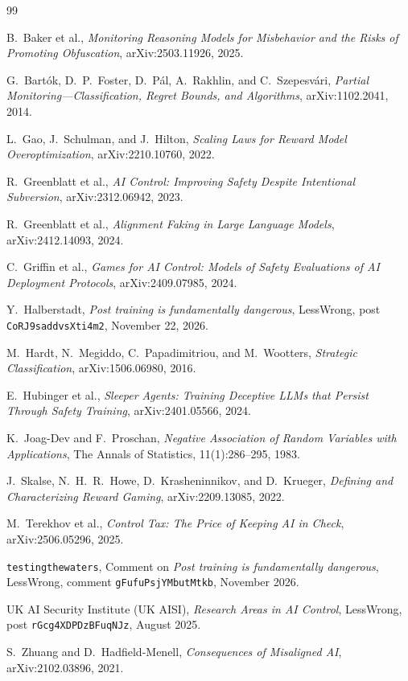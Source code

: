 \documentclass[11pt,a4paper]{article}
\begin{document}
\begin{thebibliography}{99}

B.~Baker et al.,
\emph{Monitoring Reasoning Models for Misbehavior and the Risks of Promoting Obfuscation},
arXiv:2503.11926, 2025.

G.~Bart\'ok, D.~P.~Foster, D.~P\'al, A.~Rakhlin, and C.~Szepesv\'ari,
\emph{Partial Monitoring---Classification, Regret Bounds, and Algorithms},
arXiv:1102.2041, 2014.

L.~Gao, J.~Schulman, and J.~Hilton,
\emph{Scaling Laws for Reward Model Overoptimization},
arXiv:2210.10760, 2022.

R.~Greenblatt et al.,
\emph{AI Control: Improving Safety Despite Intentional Subversion},
arXiv:2312.06942, 2023.

R.~Greenblatt et al.,
\emph{Alignment Faking in Large Language Models},
arXiv:2412.14093, 2024.

C.~Griffin et al.,
\emph{Games for AI Control: Models of Safety Evaluations of AI Deployment Protocols},
arXiv:2409.07985, 2024.

Y.~Halberstadt,
\emph{Post training is fundamentally dangerous},
LessWrong, post \texttt{CoRJ9saddvsXti4m2}, November 22, 2026.

M.~Hardt, N.~Megiddo, C.~Papadimitriou, and M.~Wootters,
\emph{Strategic Classification},
arXiv:1506.06980, 2016.

E.~Hubinger et al.,
\emph{Sleeper Agents: Training Deceptive LLMs that Persist Through Safety Training},
arXiv:2401.05566, 2024.

K.~Joag-Dev and F.~Proschan,
\emph{Negative Association of Random Variables with Applications},
The Annals of Statistics, 11(1):286--295, 1983.

J.~Skalse, N.~H.~R.~Howe, D.~Krasheninnikov, and D.~Krueger,
\emph{Defining and Characterizing Reward Gaming},
arXiv:2209.13085, 2022.

M.~Terekhov et al.,
\emph{Control Tax: The Price of Keeping AI in Check},
arXiv:2506.05296, 2025.

\texttt{testingthewaters},
Comment on \emph{Post training is fundamentally dangerous},
LessWrong, comment \texttt{gFufuPsjYMbutMtkb}, November 2026.

UK AI Security Institute (UK AISI),
\emph{Research Areas in AI Control},
LessWrong, post \texttt{rGcg4XDPDzBFuqNJz}, August 2025.

S.~Zhuang and D.~Hadfield-Menell,
\emph{Consequences of Misaligned AI},
arXiv:2102.03896, 2021.

\end{thebibliography}
\end{document}
